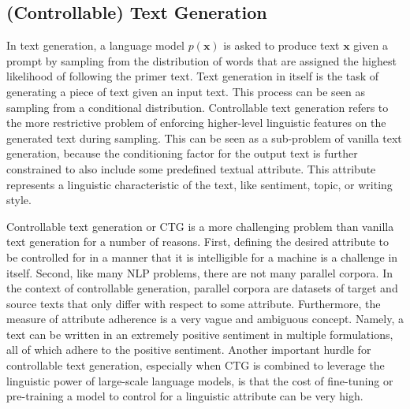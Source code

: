 \subsection{(Controllable) Text Generation}


In text generation, a language model $p(\textbf{x})$ is asked to produce text $\textbf{x}$ given a prompt by sampling from the distribution of words that are assigned the highest likelihood of following the primer text. Text generation in itself is the task of generating a piece of text given an input text. This process can be seen as sampling from a conditional distribution. Controllable text generation refers to the more restrictive problem of enforcing higher-level linguistic features on the generated text during sampling. This can be seen as a sub-problem of vanilla text generation, because the conditioning factor for the output text is further constrained to also include some predefined textual attribute. This attribute represents a linguistic characteristic of the text, like sentiment, topic, or writing style. 


Controllable text generation or CTG is a more challenging problem than vanilla text generation for a number of reasons. First, defining the desired attribute to be controlled for in a manner that it is intelligible for a machine is a challenge in itself. Second, like many NLP problems, there are not many parallel corpora. In the context of controllable generation, parallel corpora are datasets of target and source texts that only differ with respect to some attribute. Furthermore, the measure of attribute adherence is a very vague and ambiguous concept. Namely, a text can be written in an extremely positive sentiment in multiple formulations, all of which adhere to the positive sentiment. Another important hurdle for controllable text generation, especially when CTG is combined to leverage the linguistic power of large-scale language models, is that the cost of fine-tuning or pre-training a model to control for a linguistic attribute can be very high. 

